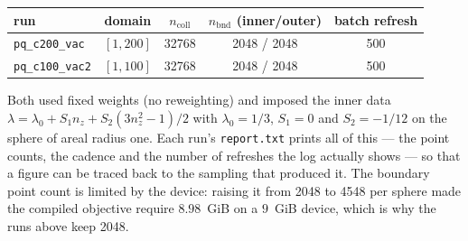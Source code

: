 \documentclass[11pt]{amsart}
\theoremstyle{proof}
\theoremstyle{definition}
\theoremstyle{example}
\theoremstyle{remark}
\numberwithin{equation}{section}
\begin{document}
\begin{center}
\begin{tabular}{lcccc}
run & domain & $n_{\mathrm{coll}}$ & $n_{\mathrm{bnd}}$ (inner/outer) & batch refresh \\
\hline
\texttt{pq\_c200\_vac}  & $[1,200]$ & 32768 & 2048 / 2048 & 500 \\
\texttt{pq\_c100\_vac2} & $[1,100]$ & 32768 & 2048 / 2048 & 500 \\
\end{tabular}
\end{center}

Both used fixed weights (no reweighting) and imposed the inner data
$\lambda = \lambda_0 + S_1 n_z + S_2 (3 n_z^2 - 1)/2$ with $\lambda_0 = 1/3$, $S_1 = 0$ and
$S_2 = -1/12$ on the sphere of areal radius one.  Each run's \texttt{report.txt} prints all of
this --- the point counts, the cadence and the number of refreshes the log actually shows --- so
that a figure can be traced back to the sampling that produced it.  The boundary point count is
limited by the device: raising it from 2048 to 4548 per sphere made the compiled objective
require $8.98$~GiB on a $9$~GiB device, which is why the runs above keep 2048.
\end{document}
